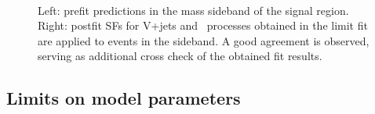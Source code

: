 \begin{figure}
\centering
  \\
\caption{Left: prefit predictions in the mass sideband of the signal region. Right: postfit SFs for V+jets and \ttbar~processes obtained in the limit fit are applied to events in the sideband. A good agreement is observed, serving as additional cross check of the obtained fit results.}
\label{Fig_sideband}
\end{figure}

\subsection{Limits on model parameters}\label{subsec:limits}

